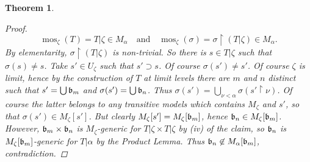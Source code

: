 \documentclass[11pt,a4paper]{report}
\newtheorem{theorem}{Theorem}[chapter] %
\theoremstyle{definition}
\theoremstyle{num.custom-title}
\theoremstyle{custom-title}
\DeclareMathOperator{\restr}{\upharpoonright}
\DeclareMathOperator{\mos}{mos}
\begin{document}
\begin{theorem}
\begin{proof}
\[
\mos_\zeta(T) = T|\zeta \in M_\alpha \quad \text{and} \quad \mos_\zeta(\sigma) = \sigma \restr (T|\zeta) \in M_\alpha.
\]
By elementarity, $\sigma \restr (T|\zeta)$ is non-trivial. So there is $s \in T|\zeta$ such that $\sigma(s) \neq s$. Take $s' \in U_\zeta$ such that $s' \supset s$. Of course $\sigma(s') \neq s'$. Of course $\zeta$ is limit, hence by the construction of $T$ at limit levels there are $m$ and $n$ distinct such that $s' = \bigcup \mathfrak{b}_m$ and $\sigma(s') = \bigcup \mathfrak{b}_n$. Thus $\sigma(s') = \bigcup_{\nu < \alpha} \sigma(s' \restr \nu)$. Of course the latter belongs to any transitive models which contains $M_\zeta$ and $s'$, so that $\sigma(s') \in M_\zeta[s']$. But clearly $M_\zeta[s'] = M_\zeta[\mathfrak{b}_m]$, hence $\mathfrak{b}_n \in M_\zeta[\mathfrak{b}_m]$. However, $\mathfrak{b}_m \times \mathfrak{b}_n$ is $M_\zeta$-generic for $T|\zeta \times T|\zeta$ by (iv) of the claim, so $\mathfrak{b}_n$ is $M_\zeta[\mathfrak{b}_m]$-generic for $T|\alpha$ by the Product Lemma. Thus $\mathfrak{b}_n \not\in M_\alpha[\mathfrak{b}_m]$, contradiction.
\end{proof}
\end{theorem}
\end{document}
